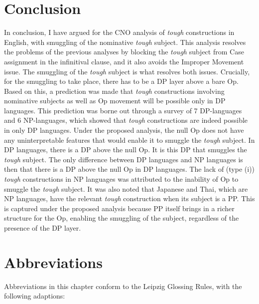 \documentclass[output=paper,colorlinks,citecolor=brown,
]{langscibook}
\begin{document}
\section{Conclusion} \label{s4ha}
In conclusion, I have argued for the CNO analysis \citep{Hicks2009} of \textit{tough} constructions in English, with smuggling of the nominative \textit{tough} subject. This analysis resolves the problems of the previous analyses by blocking the \textit{tough} subject from Case assignment in the infinitival clause, and it also avoids the Improper Movement issue. The smuggling of the \textit{tough} subject is what resolves both issues. Crucially, for the smuggling to take place, there has to be a DP layer above a bare Op. Based on this, a prediction was made that \textit{tough} constructions involving nominative subjects as well as Op movement will be possible only in DP languages. This prediction was borne out through a survey of 7 DP-languages and 6 NP-languages, which showed that \textit{tough} constructions are indeed possible in only DP languages. Under the proposed analysis, the null Op does not have any uninterpretable features that would enable it to smuggle the \textit{tough} subject. In DP languages, there is a DP above the null Op. It is this DP that smuggles the \textit{tough} subject. The only difference between DP languages and NP languages is then that there is a DP above the null Op in DP languages. The lack of (type (i)) \textit{tough} constructions in NP languages was attributed to the inability of Op to smuggle the \textit{tough} subject. It was also noted that Japanese and Thai, which are NP languages, have the relevant \textit{tough} construction when its subject is a PP. This is captured under the proposed analysis because PP itself brings in a richer structure for the Op, enabling the smuggling of the subject, regardless of the presence of the DP layer. 

\section*{Abbreviations}

Abbreviations in this chapter conform to the Leipzig Glossing Rules, with the following adaptions:
\end{document}
